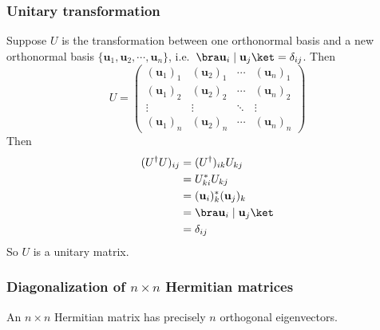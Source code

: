 \documentclass[a4paper]{article}
\begin{document}
\subsubsection{Unitary transformation}
Suppose $U$ is the transformation between one orthonormal basis and a new orthonormal basis $\{\mathbf{u}_1, \mathbf{u}_2, \cdots, \mathbf{u}_n\}$, i.e.\ $\bra \mathbf{u}_i\mid \mathbf{u}_j\ket = \delta_{ij}$. Then
\[
  U =
  \begin{pmatrix}
    (\mathbf{u}_1)_1 & (\mathbf{u}_2)_1 & \cdots & (\mathbf{u}_n)_1\\
    (\mathbf{u}_1)_2 & (\mathbf{u}_2)_2 & \cdots & (\mathbf{u}_n)_2\\
    \vdots & \vdots & \ddots & \vdots\\
    (\mathbf{u}_1)_n & (\mathbf{u}_2)_n & \cdots & (\mathbf{u}_n)_n
  \end{pmatrix}
\]
Then
\begin{align*}
  (U^\dagger U)_{ij} &= (U^\dagger)_{ik}U_{kj}\\
  &= U_{ki}^* U_{kj}\\
  &= (\mathbf{u}_i)^*_k(\mathbf{u}_j)_k\\
  &= \bra \mathbf{u}_i \mid \mathbf{u}_j \ket\\
  &= \delta_{ij}
\end{align*}
So $U$ is a unitary matrix.
\subsubsection{Diagonalization of \texorpdfstring{$n\times n$}{n x n} Hermitian matrices}
\begin{thm}
  An $n\times n$ Hermitian matrix has precisely $n$ orthogonal eigenvectors.
\end{thm}
\end{document}
